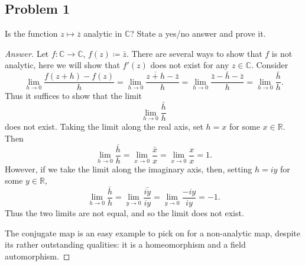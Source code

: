 \documentclass[12pt]{article}
\newcommand{\cx}{\mathbb{C}}
\newcommand{\real}{\mathbb{R}}
\theoremstyle{definition}
\begin{document}
\subsection{Problem 1}
Is the function $z \mapsto \overline{z}$ analytic in $\cx$? State a yes/no answer and prove it. 
\begin{proof}[Answer]
    Let $f : \cx \to \cx$, $f(z) \coloneqq \bar{z}$. There are several ways to show that $f$ is not analytic, here we will show that $f'(z)$ does not exist for any $z \in \cx$. Consider 
    \[
        \lim\limits_{h \to 0} \frac{f(z + h) - f(z)}{h} = \lim\limits_{h \to 0} \frac{\overline{z + h} - \bar{z}}{h} = \lim\limits_{h \to 0} \frac{\bar{z} - \bar{h} - \bar{z}}{h} = \lim\limits_{h \to 0} \frac{\bar{h}}{h} . 
    \]
    Thus it suffices to show that the limit 
    \[
        \lim\limits_{h \to 0} \frac{\bar{h}}{h}
    \]
    does not exist. Taking the limit along the real axis, set $h = x$ for some $x \in \real$. Then 
    \[
        \lim\limits_{h \to 0} \frac{\bar{h}}{h} = \lim\limits_{x \to 0} \frac{\bar{x}}{x} = \lim\limits_{x \to 0} \frac{x}{x} = 1 . 
    \]
    However, if we take the limit along the imaginary axis, then, setting $h = iy$ for some $y \in \real$, 
    \[
        \lim\limits_{h \to 0} \frac{\bar{h}}{h} = \lim\limits_{y \to 0} \frac{\bar{iy}}{iy} = \lim\limits_{y \to 0} \frac{-iy}{iy} = -1 . 
    \]
    Thus the two limits are not equal, and so the limit does not exist. 
    
    The conjugate map is an easy example to pick on for a non-analytic map, despite its rather outstanding qualities: it is a homeomorphism and a field automorphism. 
\end{proof}
\end{document}

